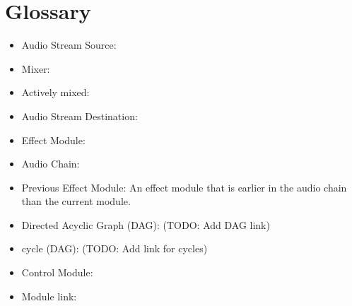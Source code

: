 \chapter{Glossary}

\begin{itemize}
	\item Audio Stream Source:
	\item Mixer:
	\item Actively mixed:
	\item Audio Stream Destination:
	\item Effect Module:
	\item Audio Chain:
	\item Previous Effect Module: An effect module that is earlier in the audio chain than the current module. 
	\item Directed Acyclic Graph (DAG): (TODO: Add DAG link)
	\item cycle (DAG): (TODO: Add link for cycles)
	\item Control Module:
	\item Module link:
\end{itemize}	